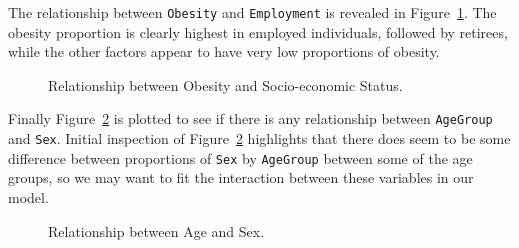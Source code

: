 \documentclass[
  letterpaper,
  DIV=11,
  numbers=noendperiod]{scrartcl}
\begin{document}
The relationship between \texttt{Obesity} and \texttt{Employment} is
revealed in Figure~\ref{fig-bar4}. The obesity proportion is clearly
highest in employed individuals, followed by retirees, while the other
factors appear to have very low proportions of obesity.

\begin{figure}


\caption{\label{fig-bar4}Relationship between Obesity and Socio-economic
Status.}

\end{figure}%

Finally Figure~\ref{fig-bar5} is plotted to see if there is any
relationship between \texttt{AgeGroup} and \texttt{Sex}. Initial
inspection of Figure~\ref{fig-bar5} highlights that there does seem to
be some difference between proportions of \texttt{Sex} by
\texttt{AgeGroup} between some of the age groups, so we may want to fit
the interaction between these variables in our model.

\begin{figure}


\caption{\label{fig-bar5}Relationship between Age and Sex.}

\end{figure}%
\end{document}

